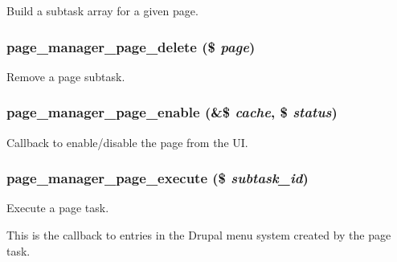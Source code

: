 \label{page_8inc_a144d13fecf042467cf2a89bf48784ec3}
Build a subtask array for a given page. \hypertarget{page_8inc_a342ab9e4d389d4aa534e26b69ee9e887}{
\subsubsection[{page\_\-manager\_\-page\_\-delete}]{\setlength{\rightskip}{0pt plus 5cm}page\_\-manager\_\-page\_\-delete (\$ {\em page})}}
\label{page_8inc_a342ab9e4d389d4aa534e26b69ee9e887}
Remove a page subtask. \hypertarget{page_8inc_ac1d2df5fdb136328eeec44b074c0b46e}{
\subsubsection[{page\_\-manager\_\-page\_\-enable}]{\setlength{\rightskip}{0pt plus 5cm}page\_\-manager\_\-page\_\-enable (\&\$ {\em cache}, \/  \$ {\em status})}}
\label{page_8inc_ac1d2df5fdb136328eeec44b074c0b46e}
Callback to enable/disable the page from the UI. \hypertarget{page_8inc_a4ee4a482e620d7558cf18fc65b05e6f3}{
\subsubsection[{page\_\-manager\_\-page\_\-execute}]{\setlength{\rightskip}{0pt plus 5cm}page\_\-manager\_\-page\_\-execute (\$ {\em subtask\_\-id})}}
\label{page_8inc_a4ee4a482e620d7558cf18fc65b05e6f3}
Execute a page task.

This is the callback to entries in the Drupal menu system created by the page task.


